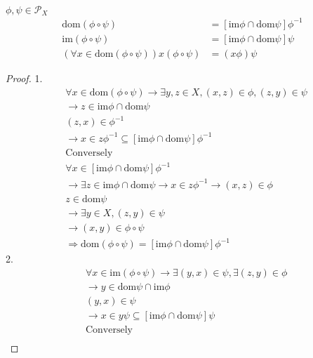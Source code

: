 \begin{Prop}
    $\phi, \psi \in \mathcal{P}_X$
    \begin{align*}
        \mathrm{dom}(\phi \circ \psi) &= [\mathrm{im} \phi \cap \mathrm{dom}\psi]\phi^{-1}     \\
        \mathrm{im}(\phi \circ \psi) &= [\mathrm{im} \phi \cap \mathrm{dom}\psi]\psi   \\
        (\forall x \in \mathrm{dom}(\phi \circ \psi))x(\phi \circ \psi) &= (x\phi)\psi
    \end{align*}
    \begin{proof}
        1.
        \begin{align*}
            &\forall x\in \mathrm{dom}(\phi\circ \psi ) \rightarrow \exists y,z \in X,(x,z)\in \phi ,(z,y)\in \psi \\
            &\rightarrow z\in \mathrm{im}\phi \cap \mathrm{dom} \psi \\
            &(z,x) \in \phi^{-1}    \\
            &\rightarrow x \in z \phi^{-1} \subseteq [\mathrm{im}\phi \cap \mathrm{dom} \psi ]\phi^{-1} \\
            &\text{Conversely}  \\
            &\forall x\in [\mathrm{im}\phi \cap \mathrm{dom}\psi ]\phi^{-1} \\
            &\rightarrow \exists z\in \mathrm{im}\phi \cap \mathrm{dom}\psi \rightarrow x \in z\phi^{-1} \rightarrow (x,z)\in \phi     \\
            &z\in \mathrm{dom}\psi \\
            &\rightarrow \exists y \in X,(z,y)\in \psi \\
            &\rightarrow (x,y)\in \phi \circ \psi   \\
            &\Rightarrow \mathrm{dom}(\phi \circ \psi )=[\mathrm{im}\phi \cap \mathrm{dom}\psi ]\phi^{-1}
        \end{align*}
        2.
        \begin{align*}
            &\forall x \in \mathrm{im}(\phi \circ \psi)\rightarrow \exists (y,x)\in \psi ,\exists (z,y) \in \phi \\
            &\rightarrow y \in \mathrm{dom}\psi \cap \mathrm{im}\phi    \\
            &(y,x)\in \psi \\
            &\rightarrow x \in y\psi \subseteq [\mathrm{im}\phi \cap \mathrm{dom}\psi ]\psi     \\
            &\text{Conversely}  \\

\end{align*}
\end{proof}
\end{Prop}
